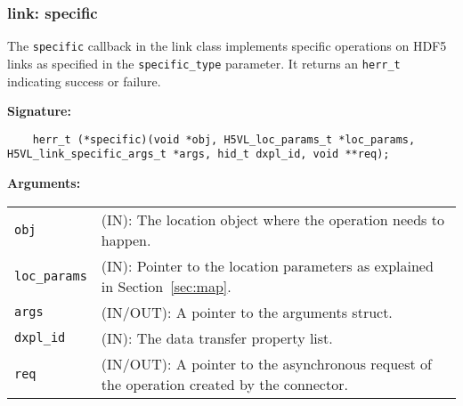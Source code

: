 \subsubsection{link: specific}
The \texttt{specific} callback in the link class implements specific operations on HDF5 links as specified in the \texttt{specific\_type} parameter. It returns an \texttt{herr\_t} indicating success or failure.\bigskip

\begin{mdframed}[style=bgbox]
\textbf{Signature:}
\begin{lstlisting}
	herr_t (*specific)(void *obj, H5VL_loc_params_t *loc_params, H5VL_link_specific_args_t *args, hid_t dxpl_id, void **req);
\end{lstlisting}

\textbf{Arguments:}\\
\begin{tabular}{l p{13.5cm}}
  \texttt{obj} & (IN): The location object  where the operation needs to happen.\\
  \texttt{loc\_params} & (IN): Pointer to the location parameters as explained in Section~\ref{sec:map}.\\
  \texttt{args} & (IN/OUT): A pointer to the arguments struct.\\
  \texttt{dxpl\_id} & (IN): The data transfer property list.\\
  \texttt{req} & (IN/OUT): A pointer to the asynchronous request of the
  operation created by the connector.\\
\end{tabular}
\end{mdframed}


